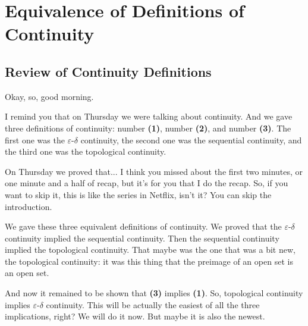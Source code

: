 \section{Equivalence of Definitions of Continuity}

\subsection{Review of Continuity Definitions}

\begin{speech}[00:00:00 - 00:01:57]
Okay, so, good morning.

I remind you that on Thursday we were talking about continuity. And we gave three definitions of continuity: number \textbf{(1)}, number \textbf{(2)}, and number \textbf{(3)}. The first one was the $\varepsilon$-$\delta$ continuity, the second one was the sequential continuity, and the third one was the topological continuity.

On Thursday we proved that... I think you missed about the first two minutes, or one minute and a half of recap, but it's for you that I do the recap. So, if you want to skip it, this is like the series in Netflix, isn't it? You can skip the introduction.

We gave these three equivalent definitions of continuity. We proved that the $\varepsilon$-$\delta$ continuity implied the sequential continuity. Then the sequential continuity implied the topological continuity. That maybe was the one that was a bit new, the topological continuity: it was this thing that the preimage of an open set is an open set.

And now it remained to be shown that \textbf{(3)} implies \textbf{(1)}. So, topological continuity implies $\varepsilon$-$\delta$ continuity. This will be actually the easiest of all the three implications, right? We will do it now. But maybe it is also the newest.
\end{speech}

